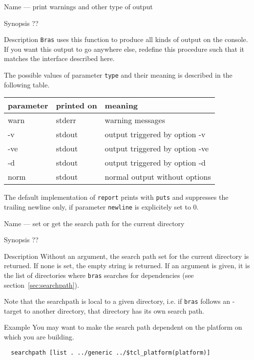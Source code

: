 \documentclass[11pt]{scrartcl}
\newcommand{\bras}{\texttt{bras}}
\newcommand{\Bras}{\texttt{Bras}}
\begin{document}
\label{proc:report}
\begin{Describe}
\item[Name]  --- print warnings and other type of output
\item[Synopsis]    ??
\item[Description] \Bras{} uses this function to produce all kinds of
  output on the console. If you want this output to go anywhere else,
  redefine this procedure such that it matches the interface described 
  here.
  
  The possible values of parameter \texttt{type} and their meaning is
  described in the following table.
  \begin{center}
    \begin{tabular}{>{\ttfamily}l>{\ttfamily}ll}
      \rmfamily parameter & \rmfamily printed on &meaning\\\hline
      warn & stderr & warning messages \\
      -v   & stdout & output triggered by option -v\\
      -ve  & stdout & output triggered by option -ve\\
      -d   & stdout & output triggered by option -d\\
      norm & stdout & normal output without options \\
    \end{tabular}
  \end{center}
  The default implementation of \texttt{report} prints with
  \texttt{puts} and suppresses the trailing newline only, if parameter 
  \texttt{newline} is explicitely set to $0$.
\end{Describe}
\begin{Describe}
\item[Name]  --- set or get the search path for the
  current directory
\item[Synopsis]  ??
\item[Description] Without an argument, the search path set for the
  current directory is returned. If none is set, the empty string is
  returned. If an argument is given, it is the list of directories
  where \bras{} searches for dependencies (see
  section~\ref{sec:searchpath}). 

  Note that the searchpath is local to a given directory, i.e. if
  \bras{} follows an -target to another directory, that
  directory has its own search path.
\item[Example]
You may want to make the search path dependent on the platform on
which you are building.
\begin{verbatim}
  searchpath [list . ../generic ../$tcl_platform(platform)]
\end{verbatim}
\end{Describe}
\end{document}
